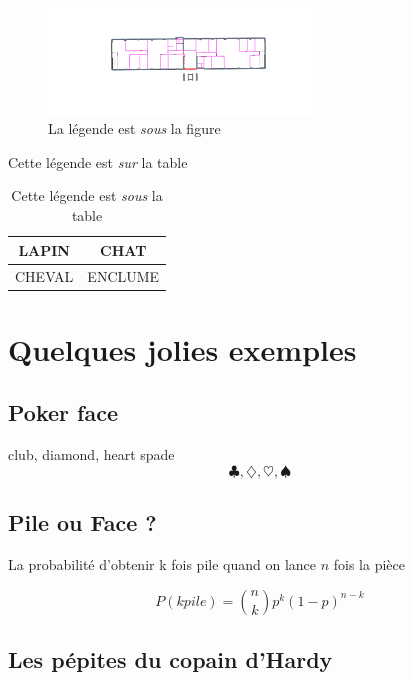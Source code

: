 \documentclass[twocolumn,a4paper]{IEEEtranfr}
\begin{document}
\begin{figure}[htbp]
\begin{centering}
\par
\includegraphics[width=7cm]{Gs2.pdf}
\caption{La légende est \emph{sous} la figure}
\end{centering}
\end{figure}
%



\begin{table}[htbp]
\caption{Cette légende  est \emph{sur} la table}
\centering{}
\begin{tabular}{|c|c|}
\hline 
LAPIN & CHAT \tabularnewline
\hline
\hline 
CHEVAL  & ENCLUME \tabularnewline
\hline
\end{tabular}
\caption{Cette légende  est \emph{sous} la table}
\end{table}
 
\section{Quelques jolies exemples}

\subsection{Poker face}

club, diamond, heart spade
$$\clubsuit, \diamondsuit, \heartsuit ,\spadesuit$$

\subsection{Pile ou Face ? }

La probabilité d'obtenir k fois pile quand on lance $n$ fois la pièce

\begin{equation}
    P(k pile)   = {n \choose k} p^k (1-p)^{ n-k}
\end{equation}

\subsection{Les pépites du copain d'Hardy}
\end{document}
